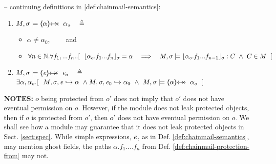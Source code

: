 {\begin{definition} 
\label{def:chainmail-protection-from}
\label{sect:semantics:assert:prtFrom}
-- continuing definitions in \ref{def:chainmail-semantics}:
\begin{enumerate}
\item
\label{cProtected}
 $\satisfiesA{M}{\sigma}{\protectedFrom{{\alpha}} {{\alpha_{o}}}}   \ \ \ \triangleq $ 
  \begin{itemize}
 \item
$\alpha\neq \alpha_0$,
 \ \ \ \  and%
 \item
$\forall n\in\mathbb{N}. \forall f_1,...f_n..
[\ \ \interpret{\sigma}{\alpha_{o}.f_1...f_n}=\alpha \ \ \  \Longrightarrow \ \ \  \satisfiesA{M}{\sigma}{ {\interpret{\sigma}{\alpha_{o}.f_1...f_{n-1}}}:C} \ \wedge \ C\in M\ \ ]$
\end{itemize}
\item
$\satisfiesA{M}{\sigma}{\protectedFrom{{\re}} {{\re_{o}}}} \ \ \ \triangleq $ \\
  $\exists \alpha, \alpha_{o}. [\  \ \eval{M}{\sigma}{{\re}}{\alpha}\ \wedge \eval{M}{\sigma}{{\re_0}}{\alpha_0} \  \wedge \ 
  \satisfiesA{M}{\sigma}{\protectedFrom{{\alpha}} {{\alpha_{o}}}}
 \ \  ]$
 \end{enumerate}
 \end{definition} 
 
 \noindent
 {\textbf{NOTES:}  \notesep $o$ being protected from $o'$ does not imply that $o'$ does not have eventual permission on $o$. However, if the module does not leak protected objects, then if  $o$ is protected from $o'$, then $o'$ does not have eventual permission on $o$. We shall  see how a module may guarantee that it does not leak protected objects in Sect. \ref{sect:spec}.
\notesep While simple expressions, $\mathit{e}$, as in Def. \ref{def:chainmail-semantics},  may mention ghost fields,   the paths $\alpha.f_1....f_n$ 
 from Def. \ref{def:chainmail-protection-from} may not. %

}}
